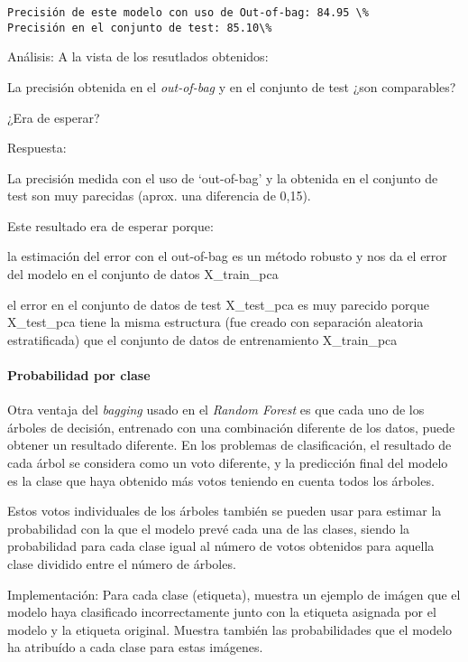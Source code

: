\documentclass[11pt]{article}
\begin{document}
    \begin{Verbatim}[commandchars=\\\{\}]
Precisión de este modelo con uso de Out-of-bag: 84.95 \%
Precisión en el conjunto de test: 85.10\%

    \end{Verbatim}

    Análisis: A la vista de los resutlados obtenidos:

La precisión obtenida en el \emph{out-of-bag} y en el conjunto de test
¿son comparables?

¿Era de esperar?

    Respuesta:

La precisión medida con el uso de `out-of-bag' y la obtenida en el
conjunto de test son muy parecidas (aprox. una diferencia de 0,15).

Este resultado era de esperar porque:

la estimación del error con el out-of-bag es un método robusto y nos da
el error del modelo en el conjunto de datos X\_train\_pca

el error en el conjunto de datos de test X\_test\_pca es muy parecido
porque X\_test\_pca tiene la misma estructura (fue creado con separación
aleatoria estratificada) que el conjunto de datos de entrenamiento
X\_train\_pca

    \hypertarget{probabilidad-por-clase}{%
\paragraph{Probabilidad por clase}\label{probabilidad-por-clase}}

    Otra ventaja del \emph{bagging} usado en el \emph{Random Forest} es que
cada uno de los árboles de decisión, entrenado con una combinación
diferente de los datos, puede obtener un resultado diferente. En los
problemas de clasificación, el resultado de cada árbol se considera como
un voto diferente, y la predicción final del modelo es la clase que haya
obtenido más votos teniendo en cuenta todos los árboles.

Estos votos individuales de los árboles también se pueden usar para
estimar la probabilidad con la que el modelo prevé cada una de las
clases, siendo la probabilidad para cada clase igual al número de votos
obtenidos para aquella clase dividido entre el número de árboles.

    Implementación: Para cada clase (etiqueta), muestra un ejemplo de imágen
que el modelo haya clasificado incorrectamente junto con la etiqueta
asignada por el modelo y la etiqueta original. Muestra también las
probabilidades que el modelo ha atribuído a cada clase para estas
imágenes.
\end{document}
